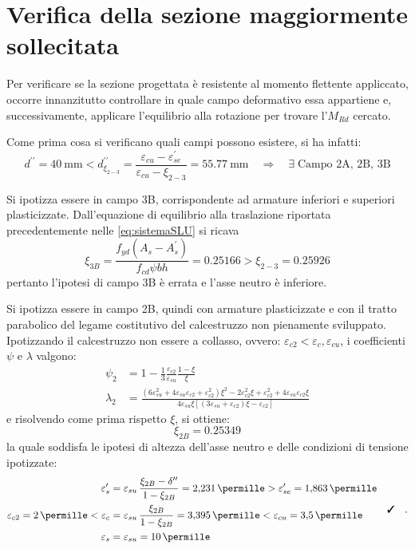 \section{Verifica della sezione maggiormente sollecitata}
Per verificare se la sezione progettata è resistente al momento flettente appliccato, occorre innanzitutto controllare in quale campo deformativo essa appartiene e, successivamente, applicare l'equilibrio alla rotazione per trovare l'$M_{Rd}$ cercato.

Come prima cosa si verificano quali campi possono esistere, si ha infatti:
\begin{equation}
  d^{\prime\prime} = \SI{40}{\milli\metre} <  d^{\prime\prime}_{\xi_{2-3}} = \frac{\varepsilon_{cu} - \varepsilon_{se}^\prime}{\varepsilon_{cu} - \xi_{2-3}} =\SI{55.77}{\milli\metre} \quad \Longrightarrow  \quad \exists \; \text{Campo 2A, 2B, 3B}
\end{equation}

Si ipotizza essere in campo 3B, corrispondente ad armature inferiori e superiori plasticizzate.
Dall'equazione di equilibrio alla traslazione riportata precedentemente nelle \ref{eq:sistemaSLU} si ricava
\[
  \xi_{3B} = \frac{f_{yd} (A_s - A_s^\prime)}{f_{cd} \psi b h} = \num{0.25166} > \xi_{2-3} = \num{0.25926}
\]
pertanto l'ipotesi di campo 3B è errata e l'asse neutro è inferiore.

Si ipotizza essere in campo 2B, quindi con armature plasticizzate e con il tratto parabolico del legame costitutivo del calcestruzzo non pienamente sviluppato.
Ipotizzando il calcestruzzo non essere a collasso, ovvero: $\varepsilon_{c2} < \varepsilon_{c} , \varepsilon_{cu}$, i coefficienti $\psi$ e $\lambda$ valgono:
\[
  \begin{split}
    \psi_{2} &= 1 - \frac{1}{3}   \frac{\varepsilon_{c2}}{\varepsilon_{su}}\frac{1-\xi}{\xi}\\
    \lambda_{2} &= \frac{\left( 6\varepsilon_{su}^2 + 4\varepsilon_{su}\varepsilon_{c2} + \varepsilon_{c2}^2 \right)\xi^2 -2\varepsilon_{c2}^2 \xi + \varepsilon_{c2}^2 + 4\varepsilon_{su}\varepsilon_{c2}\xi}{4\varepsilon_{su}\xi \left[ \left( 3\varepsilon_{su} + \varepsilon_{c2} \right)\xi - \varepsilon_{c2} \right]}
  \end{split}  
\]
e risolvendo come prima rispetto $\xi$, si ottiene:
\begin{equation}
  \xi_{2B} = \num{0.25349}
\end{equation}
la quale soddisfa le ipotesi di altezza dell'asse neutro e delle condizioni di tensione ipotizzate:
\begin{equation}
  \begin{split}
    \varepsilon_{s}^\prime &= \varepsilon_{su}\,\frac{\xi_{2B} - \delta^{\prime\prime}}{1-\xi_{2B}} = \SI{2.231}{\permille} > \varepsilon_{se}^\prime = \SI{1.863}{\permille}\\
    \varepsilon_{c2} = \SI{2}{\permille} < \varepsilon_{c} &= \varepsilon_{su} \,\frac{\xi_{2B}}{1-\xi_{2B}} =  \SI{3.395}{\permille} < \varepsilon_{cu} = \SI{3.5}{\permille}\\
    \varepsilon_{s} &= \varepsilon_{su} = \SI{10}{\permille}
  \end{split}
  \quad \checked \quad .
\end{equation}

